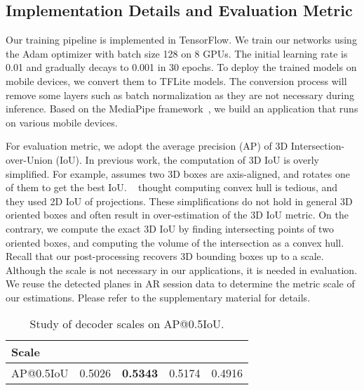 \documentclass[runningheads]{llncs}
\begin{document}
\subsection{Implementation Details and Evaluation Metric}
Our training pipeline is implemented in TensorFlow. We train our networks using the Adam optimizer with batch size 128 on 8 GPUs. The initial learning rate is 0.01 and gradually decays to 0.001 in 30 epochs. To deploy the trained models on mobile devices, we convert them to TFLite models. The conversion process will remove some layers such as batch normalization as they are not necessary during inference. Based on the MediaPipe framework~\cite{MediaPipe}, we build an application that runs on various mobile devices.

For evaluation metric, we adopt the average precision (AP) of 3D Intersection-over-Union (IoU). In previous work, the computation of 3D IoU is overly simplified. For example, \cite{Wang_2019_NOCS} assumes two 3D boxes are axis-aligned, and rotates one of them to get the best IoU. ~\cite{Tekin_2018_SingleShot} thought computing convex hull is tedious, and they used 2D IoU of projections. These simplifications do not hold in general 3D oriented boxes and often result in over-estimation of the 3D IoU metric. On the contrary, we compute the exact 3D IoU by finding intersecting points of two oriented boxes, and computing the volume of the intersection as a convex hull. Recall that our post-processing recovers 3D bounding boxes up to a scale. Although the scale is not necessary in our applications, it is needed in evaluation. We reuse the detected planes in AR session data to determine the metric scale of our estimations. Please refer to the supplementary material for details.


\begin{table}[t]
\begin{center}
\begin{tabular}{l@{\hskip 0.2cm}|@{\hskip 0.2cm}c@{\hskip 0.2cm}|@{\hskip 0.2cm}c@{\hskip 0.2cm}|@{\hskip 0.2cm}c@{\hskip 0.2cm}|c}
\hline
Scale &  &  &  &  \\
\hline
AP@0.5IoU & 0.5026 & \textbf{0.5343} & 0.5174 & 0.4916\\
\hline
\end{tabular}
\caption{Study of decoder scales on AP@0.5IoU.}
\label{tab:scale}
\end{center}
\end{table}
\end{document}
